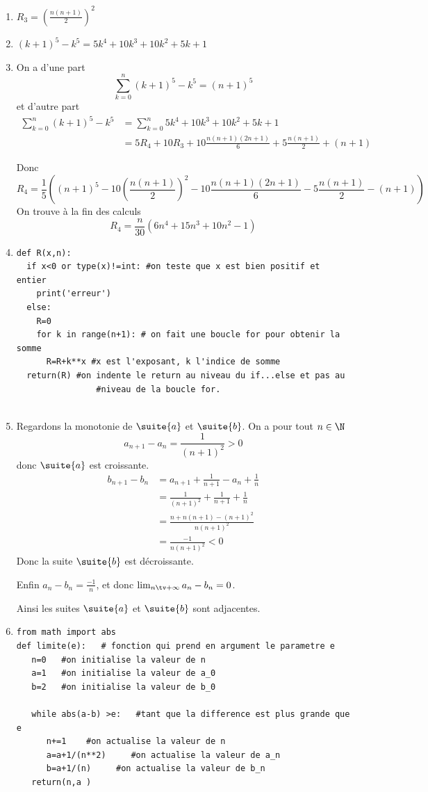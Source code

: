 \begin{correction}
\begin{enumerate}
\item $R_3 =\left(\frac{n(n+1)}{2}\right)^2$
\item $(k+1)^5-k^5 = 5k^4 +10k^3+10k^2 +5k +1 $
\item On a d'une part 
$$\sum_{k=0}^n(k+1)^5 -k^5 = (n+1)^5$$
et d'autre part 
\begin{align*}
\sum_{k=0}^n(k+1)^5 -k^5  &=\sum_{k=0}^n 5k^4 +10k^3+10k^2 +5k +1 \\
											&= 5 R_4  +10 R_3 +10 \frac{n(n+1)(2n+1)}{6} +5 \frac{n(n+1)}{2}+ (n+1)
\end{align*}

Donc 
$$R_4 =\frac{1}{5} \left( (n+1)^5- 10\left(\frac{n(n+1)}{2}\right)^2 -10  \frac{n(n+1)(2n+1)}{6}  - 5 \frac{n(n+1)}{2}-(n+1) \right)$$
On trouve à la fin des calculs 
$$R_4 = \frac{n}{30} (6n^4+15n^3 +10n^2-1)$$

\item 
\begin{lstlisting}
def R(x,n):
  if x<0 or type(x)!=int: #on teste que x est bien positif et entier
    print('erreur')
  else:
    R=0
    for k in range(n+1): # on fait une boucle for pour obtenir la somme
      R=R+k**x #x est l'exposant, k l'indice de somme 
  return(R) #on indente le return au niveau du if...else et pas au 
  				#niveau de la boucle for. 
   	

\end{lstlisting}

\item Regardons la monotonie de $\suite{a}$ et $\suite{b}$. On a pour tout $n\in \N$
$$a_{n+1} -a_{n}= \frac{1}{(n+1)^2}>0$$ 
donc $\suite{a}$ est  croissante. 
\begin{align*}
b_{n+1} -b_{n} &= a_{n+1} +\frac{1}{n+1}-a_{n}+\frac{1}{n}\\
						&= \frac{1}{(n+1)^2} +\frac{1}{n+1}+\frac{1}{n}\\
						&= \frac{n +n(n+1)-(n+1)^2}{n(n+1)^2}\\
						&= \frac{-1}{n(n+1)^2} <0
\end{align*}
Donc la suite $\suite{b}$ est décroissante. 

Enfin  $a_n-b_n= \frac{-1}{n}$, et donc $\lim_{n\tv+\infty} a_n-b_n =0$. 

Ainsi les suites $\suite{a}$ et $\suite{b}$ sont adjacentes. 

\item 
\begin{lstlisting}
from math import abs
def limite(e):   # fonction qui prend en argument le parametre e
   n=0   #on initialise la valeur de n 
   a=1   #on initialise la valeur de a_0
   b=2   #on initialise la valeur de b_0
  
   while abs(a-b) >e:   #tant que la difference est plus grande que e
      n+=1    #on actualise la valeur de n
      a=a+1/(n**2)     #on actualise la valeur de a_n
      b=a+1/(n)     #on actualise la valeur de b_n
   return(n,a ) 
    
\end{lstlisting}
\end{enumerate}
\end{correction}
